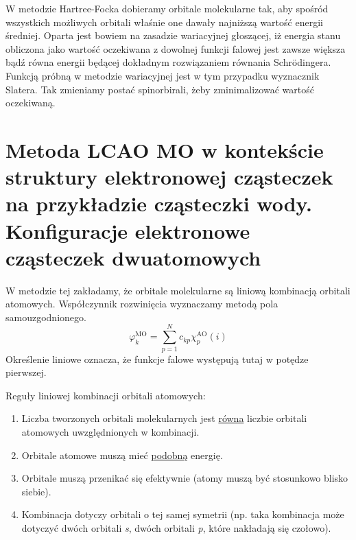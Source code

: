 \documentclass{article}
\begin{document}
W metodzie Hartree-Focka dobieramy orbitale molekularne tak, aby spośród wszystkich możliwych orbitali właśnie one dawały najniższą wartość energii średniej. Oparta jest bowiem na zasadzie wariacyjnej głoszącej, iż energia stanu obliczona jako wartość oczekiwana z dowolnej funkcji falowej jest zawsze większa bądź równa energii będącej dokładnym rozwiązaniem równania Schrödingera. Funkcją próbną w metodzie wariacyjnej jest w tym przypadku wyznacznik Slatera. Tak zmieniamy postać spinorbirali, żeby zminimalizować wartość oczekiwaną.

\section{Metoda LCAO MO w kontekście struktury elektronowej cząsteczek na przykładzie cząsteczki wody. Konfiguracje elektronowe cząsteczek dwuatomowych}
W metodzie tej zakładamy, że orbitale molekularne są liniową kombinacją orbitali atomowych. Współczynnik rozwinięcia wyznaczamy metodą pola samouzgodnionego.
\begin{equation*}
    \varphi_k^{\text{MO}}=\sum_{p=1}^Nc_{kp}\chi_p^{\text{AO}}(i)
\end{equation*}
Określenie liniowe oznacza, że funkcje falowe występują tutaj w potędze pierwszej. 

Reguły liniowej kombinacji orbitali atomowych:
\begin{enumerate}
    \item Liczba tworzonych orbitali molekularnych jest \underline{równa} liczbie orbitali atomowych uwzględnionych w kombinacji. 
    \item Orbitale atomowe muszą mieć \underline{podobną} energię. 
    \item Orbitale muszą przenikać się efektywnie (atomy muszą być stosunkowo blisko siebie).
    \item Kombinacja dotyczy orbitali o tej samej symetrii (np. taka kombinacja może dotyczyć dwóch orbitali \textit{s}, dwóch orbitali \textit{p}, które nakładają się czołowo). 
\end{enumerate}
\end{document}
